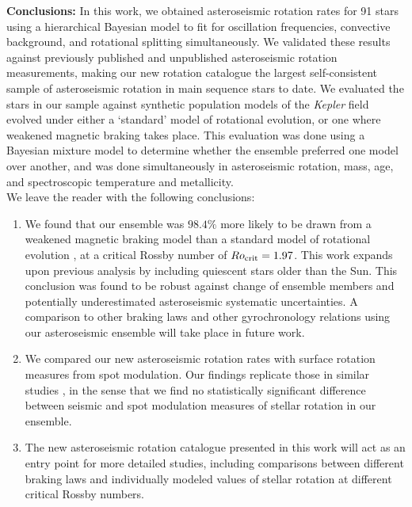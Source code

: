 \documentclass[12pt]{article}
\begin{document}
\textbf{Conclusions:} In this work, we obtained asteroseismic rotation rates for 91 stars using a hierarchical Bayesian model to fit for oscillation frequencies, convective background, and rotational splitting simultaneously. We validated these results against previously published and unpublished asteroseismic rotation measurements, making our new rotation catalogue the largest self-consistent sample of asteroseismic rotation in main sequence stars to date. We evaluated the stars in our sample against synthetic population models of the \textit{Kepler} field evolved under either a `standard' model of rotational evolution, or one where weakened magnetic braking takes place. This evaluation was done using a Bayesian mixture model to determine whether the ensemble preferred one model over another, and was done simultaneously in asteroseismic rotation, mass, age, and spectroscopic temperature and metallicity.\\

We leave the reader with the following conclusions:
\begin{enumerate}
	\item We found that our ensemble was $98.4\%$ more likely to be drawn from a weakened magnetic braking model than a standard model of rotational evolution \cite{vansaders+pinsonneault2013}, at a critical Rossby number of $Ro_{\rm{crit}} = 1.97$. This work expands upon previous analysis \cite{vansaders+2019} by including quiescent stars older than the Sun. This conclusion was found to be robust against change of ensemble members and potentially underestimated asteroseismic systematic uncertainties. A comparison to other braking laws \cite{matt+2015} and other gyrochronology relations \cite{barnes2010} using our asteroseismic ensemble will take place in future work.
	
	\item We compared our new asteroseismic rotation rates with surface rotation measures from spot modulation. Our findings replicate those in similar studies \cite{nielsen+2015,benomar+2015}, in the sense that we find no statistically significant difference between seismic and spot modulation measures of stellar rotation in our ensemble.
	
	\item The new asteroseismic rotation catalogue presented in this work will act as an entry point for more detailed studies, including comparisons between different braking laws and individually modeled values of stellar rotation at different critical Rossby numbers.
	
\end{enumerate}
\end{document}
